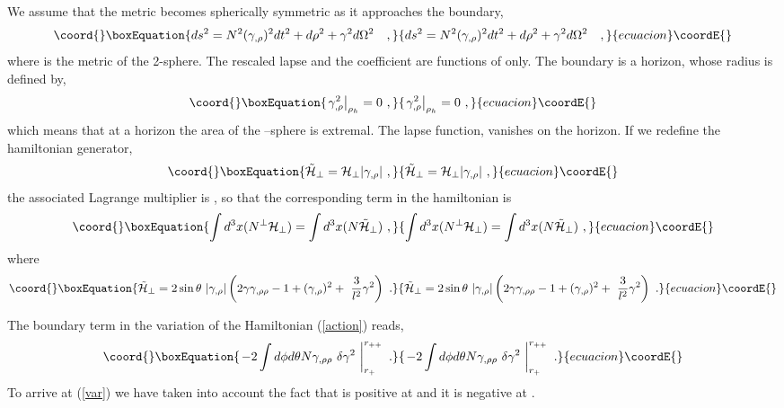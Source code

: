 \documentclass[a4paper,preprintnumbers,amsmath,amssymb]{revtex4}
\begin{document}
 We assume that  the metric  becomes spherically symmetric as it approaches the boundary,
\begin{equation}\coord{}\boxEquation{
ds^2= N^2 (\gamma_{,\rho})^2 dt^2 + d\rho^2 + \gamma^2 d\Omega^2 \ \ \ , \label{boundaryform}
}{
ds^2= N^2 (\gamma_{,\rho})^2 dt^2 + d\rho^2 + \gamma^2 d\Omega^2 \ \ \ , }{ecuacion}\coordE{}\end{equation}
where \coordHE{} is the metric of the 2-sphere. The rescaled lapse \coordHE{} and the coefficient
\myHighlight{$\gamma$}\coordHE{} are functions of \myHighlight{$\rho$}\coordHE{} only. The boundary is a horizon, whose radius \coordHE{} is defined by,
\begin{equation}\coord{}\boxEquation{
\left.\gamma^2_{,\rho} \right|_{\rho_h} = 0 \ ,
\label{horizon}
}{
\left.\gamma^2_{,\rho} \right|_{\rho_h} = 0 \ ,
}{ecuacion}\coordE{}\end{equation}
which means that at a horizon the area of the \coordHE{}--sphere is extremal.
The lapse function, \coordHE{} vanishes on the horizon.
If we redefine the hamiltonian generator,
\begin{equation}\coord{}\boxEquation{
\tilde{{\cal H}}_{\perp} = {\cal H}_{\perp}   |\gamma_{,\rho}|  \ ,
\label{ham}
}{
\tilde{{\cal H}}_{\perp} = {\cal H}_{\perp}   |\gamma_{,\rho}|  \ ,
}{ecuacion}\coordE{}\end{equation}
the associated Lagrange multiplier is \coordHE{}, so that the
corresponding term in the hamiltonian is
\begin{equation}\coord{}\boxEquation{
\int d^3 x(N^{\perp}{\cal H}_{\perp}) =  \int d^3 x(N{\tilde{\cal H}}_{\perp}) \ ,
\label{action}
}{
\int d^3 x(N^{\perp}{\cal H}_{\perp}) =  \int d^3 x(N{\tilde{\cal H}}_{\perp}) \ ,
}{ecuacion}\coordE{}\end{equation}
where
\begin{equation}\coord{}\boxEquation{
\tilde{{\cal H}}_\perp
= 2\sin\theta\   |\gamma_{,\rho}|  \left(2\gamma\gamma_{,\rho\rho} - 1 + (\gamma_{ ,\rho})^2 + \
\frac{3}{l^2}\gamma^2\right)  \ .
\label{cons}
}{
\tilde{{\cal H}}_\perp
= 2\sin\theta\   |\gamma_{,\rho}|  \left(2\gamma\gamma_{,\rho\rho} - 1 + (\gamma_{ ,\rho})^2 + \
\frac{3}{l^2}\gamma^2\right)  \ .
}{ecuacion}\coordE{}\end{equation}

 The  boundary term in the variation of the Hamiltonian (\ref{action})  reads,
\begin{equation}\coord{}\boxEquation{
\left.
-2 \int d\phi d\theta N \gamma_{,\rho\rho} \ \delta
\gamma^2 \ \right|^{r_{++}}_{r_+} \  .
\label{var}
}{
\left.
-2 \int d\phi d\theta N \gamma_{,\rho\rho} \ \delta
\gamma^2 \ \right|^{r_{++}}_{r_+} \  .
}{ecuacion}\coordE{}\end{equation}
To arrive at  (\ref{var}) we have taken into account the fact that \myHighlight{$\gamma_{,\rho}$}\coordHE{}
is positive at \coordHE{} and it is negative at \coordHE{}.
\end{document}
